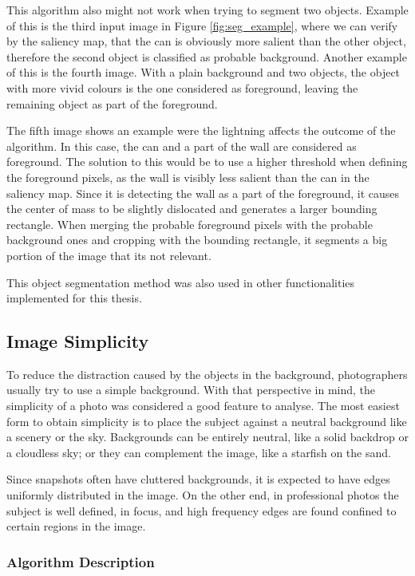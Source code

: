 This algorithm also might not work when trying to segment two objects. Example of this is the third input image in Figure \ref{fig:seg_example}, where we can verify by the saliency map, that the can is obviously more salient than the other object, therefore the second object is classified as probable background. Another example of this is the fourth image. With a plain background and two objects, the object with more vivid colours is the one considered as foreground, leaving the remaining object as part of the foreground.

The fifth image shows an example were the lightning affects the outcome of the algorithm. In this case, the can and a part of the wall are considered as foreground. The solution to this would be to use a higher threshold when defining the foreground pixels, as the wall is visibly less salient than the can in the saliency map. Since it is detecting the wall as a part of the foreground, it causes the center of mass to be slightly dislocated and generates a larger bounding rectangle. When merging the probable foreground pixels with the probable background ones and cropping with the bounding rectangle, it segments a big portion of the image that its not relevant.

This object segmentation method was also used in other functionalities implemented for this thesis.

\subsection{Image Simplicity}
\label{sub:background}

To reduce the distraction caused by the objects in the background, photographers usually try to use a simple background. With that perspective in mind, the simplicity of a photo was considered a good feature to analyse.
The most easiest form to obtain simplicity is to place the subject against a neutral background like a scenery or the sky. Backgrounds can be entirely neutral, like a solid backdrop or a cloudless sky; or they can complement the image, like a starfish on the sand.

Since snapshots often have cluttered backgrounds, it is expected to have edges uniformly distributed in the image. On the other end, in professional photos the subject is well defined, in focus, and high frequency edges are found confined to certain regions in the image.

\subsubsection{Algorithm Description}


